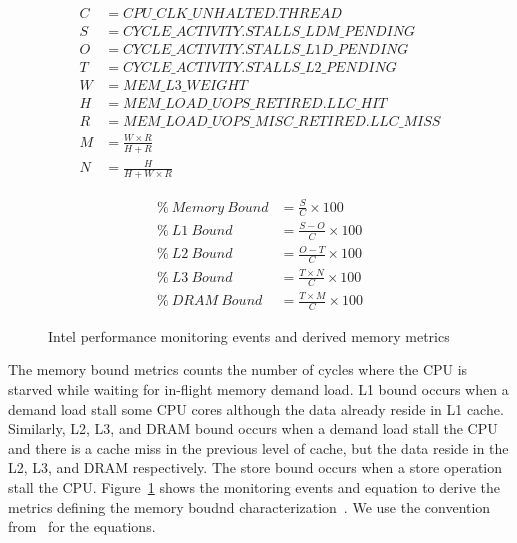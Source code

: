 \documentclass[conference]{IEEEtran}
\begin{document}
\begin{figure}[h!]
	\noindent
	\begin{minipage}
		{0.5\textwidth}
		\begin{align*}
			C & = CPU\_CLK\_UNHALTED.THREAD                \\
			S & = CYCLE\_ACTIVITY.STALLS\_LDM\_PENDING     \\
			O & = CYCLE\_ACTIVITY.STALLS\_L1D\_PENDING     \\
			T & = CYCLE\_ACTIVITY.STALLS\_L2\_PENDING      \\
			W & = MEM\_L3\_WEIGHT                          \\
			H & = MEM\_LOAD\_UOPS\_RETIRED.LLC\_HIT        \\
			R & = MEM\_LOAD\_UOPS\_MISC\_RETIRED.LLC\_MISS \\
			M & = \frac{W \times R}{H + R}                 \\
			N & = \frac{H}{H + W \times R}                 
		\end{align*}
	\end{minipage}
	\begin{minipage}
		{0.5\textwidth}
		\begin{align}
			\%~Memory~Bound & = \frac{S}{C} \times 100          \\
			\%~L1~Bound     & = \frac{S - O}{C} \times 100      \\
			\%~L2~Bound     & = \frac{O - T}{C} \times 100      \\
			\%~L3~Bound     & = \frac{T \times N}{C} \times 100 \\
			\%~DRAM~Bound   & = \frac{T \times M}{C} \times 100 
		\end{align}
	\end{minipage}
	\caption{Intel performance monitoring events and derived memory metrics}
	\label{fig:memory-metrics}
\end{figure}
			
The memory bound metrics counts the number of cycles where the CPU is starved while waiting for in-flight memory demand load. L1 bound occurs when a demand load stall some CPU cores although the data already reside in L1 cache. Similarly, L2, L3, and DRAM bound occurs when a demand load stall the CPU and there is a cache miss in the previous level of cache, but the data reside in the L2, L3, and DRAM respectively. The store bound occurs when a store operation stall the CPU. Figure~\ref{fig:memory-metrics} shows the monitoring events and equation to derive the metrics defining the memory boudnd characterization~\cite{Intel2006-lc}. We use the convention from~\cite{Kukunas2015-jd} for the equations.
			
\end{document}
